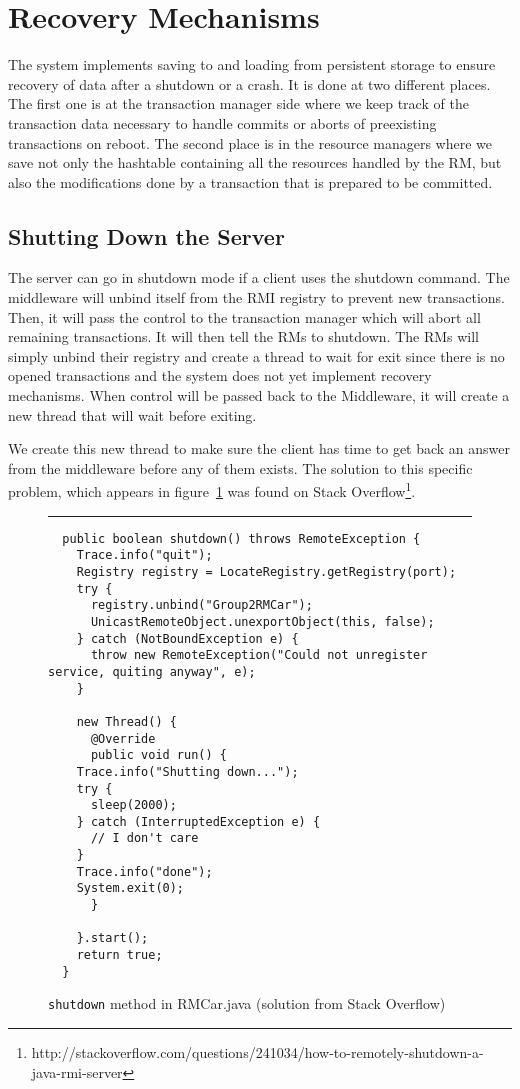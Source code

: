 \documentclass[12pt]{article}
\theoremstyle{plain}%
\theoremstyle{definition}
\theoremstyle{remark}
\newcommand{\java}[1]{{\lstinline!#1!}}
\newenvironment{figureone}[1]{%
  \def\deffigurecaption{#1}%
  \begin{figure}[htbp]%
  \begin{center}%
  \begin{minipage}{\columnwidth}%
  \hrule \vspace*{2ex}%
}{%
  \end{minipage}%
  \end{center}%
  \caption{\deffigurecaption}%
  \end{figure}%
}
\begin{document}
\section{Recovery Mechanisms}

The system implements saving to and loading from persistent storage to 
ensure recovery of data after a shutdown or a crash. It is done at two 
different places. The first one is at the transaction manager side where 
we keep track of the transaction data necessary to handle commits or 
aborts of preexisting transactions on reboot. The second place is in the 
resource managers where we save not only the hashtable containing all 
the resources handled by the RM, but also the modifications done by
a transaction that is prepared to be committed.

\subsection{Shutting Down the Server}

The server can go in shutdown mode if a client uses the shutdown command. 
The middleware will unbind itself from the RMI registry to prevent new 
transactions. Then, it will pass the control to the transaction manager 
which will abort all remaining transactions. It will then tell the RMs 
to shutdown. The RMs will simply unbind their registry and create a 
thread to wait for exit since there is no opened transactions and the 
system does not yet implement recovery mechanisms. When control will be 
passed back to the Middleware, it will create a new thread that will wait 
before exiting.

We create this new thread to make sure the client has time to get back an 
answer from the middleware before any of them exists. The solution to this 
specific problem, which appears in figure~\ref{fig:shutdown} was found on 
Stack Overflow\footnote{http://stackoverflow.com/questions/241034/how-to-remotely-shutdown-a-java-rmi-server}.

\begin{figureone}{\java{shutdown} method in RMCar.java (solution from Stack Overflow) \label{fig:shutdown}}
\begin{lstlisting}
  public boolean shutdown() throws RemoteException {
    Trace.info("quit");
    Registry registry = LocateRegistry.getRegistry(port);
    try {
      registry.unbind("Group2RMCar");
      UnicastRemoteObject.unexportObject(this, false);
    } catch (NotBoundException e) {
      throw new RemoteException("Could not unregister service, quiting anyway", e);
    }

    new Thread() {
      @Override
      public void run() {
	Trace.info("Shutting down...");
	try {
	  sleep(2000);
	} catch (InterruptedException e) {
	  // I don't care
	}
	Trace.info("done");
	System.exit(0);
      }

    }.start();
    return true;
  }
\end{lstlisting}
\end{figureone}
\end{document}
